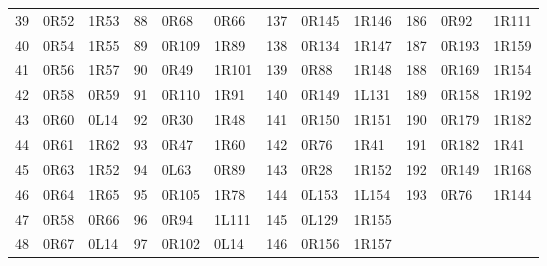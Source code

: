 \begin{center}
\begin{tabular}{rll@{\hspace{1.2em}}rll@{\hspace{1.2em}}rll@{\hspace{1.2em}}rll}
39 & 0R52 & 1R53 & 88 & 0R68 & 0R66 & 137 & 0R145 & 1R146 & 186 & 0R92 & 1R111\\
40 & 0R54 & 1R55 & 89 & 0R109 & 1R89 & 138 & 0R134 & 1R147 & 187 & 0R193 & 1R159\\
41 & 0R56 & 1R57 & 90 & 0R49 & 1R101 & 139 & 0R88 & 1R148 & 188 & 0R169 & 1R154\\
42 & 0R58 & 0R59 & 91 & 0R110 & 1R91 & 140 & 0R149 & 1L131 & 189 & 0R158 & 1R192\\
43 & 0R60 & 0L14 & 92 & 0R30 & 1R48 & 141 & 0R150 & 1R151 & 190 & 0R179 & 1R182\\
44 & 0R61 & 1R62 & 93 & 0R47 & 1R60 & 142 & 0R76 & 1R41 & 191 & 0R182 & 1R41\\
45 & 0R63 & 1R52 & 94 & 0L63 & 0R89 & 143 & 0R28 & 1R152 & 192 & 0R149 & 1R168\\
46 & 0R64 & 1R65 & 95 & 0R105 & 1R78 & 144 & 0L153 & 1L154 & 193 & 0R76 & 1R144\\
47 & 0R58 & 0R66 & 96 & 0R94 & 1L111 & 145 & 0L129 & 1R155 &  & & \\
48 & 0R67 & 0L14 & 97 & 0R102 & 0L14 & 146 & 0R156 & 1R157 &  & & \\
\bottomrule\end{tabular}
\endgroup\end{center}
